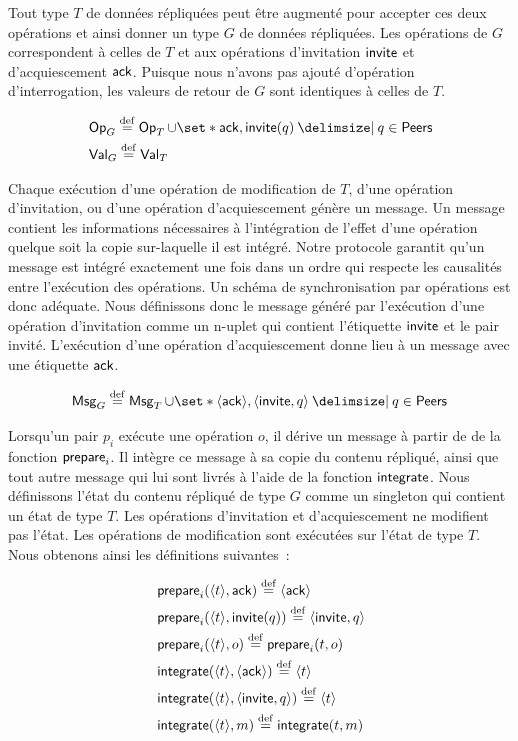 Tout type $T$ de données répliquées peut être augmenté pour accepter ces deux opérations et ainsi donner un type $G$ de données répliquées.
Les opérations de $G$ correspondent à celles de $T$ et aux opérations d'invitation $\operatorname{\mathsf{invite}}$ et d'acquiescement $\operatorname{\mathsf{ack}}$.
Puisque nous n'avons pas ajouté d'opération d'interrogation, les valeurs de retour de $G$ sont identiques à celles de $T$.

\begin{align*}
    &\trm{Op}_G \defeq \trm{Op}_T \cup \set*{\trm{ack}, \trm{invite}(q) \given q \in \trm{Peers}}\\
    &\trm{Val}_G \defeq \trm{Val}_T
\end{align*}

Chaque exécution d'une opération de modification de $T$, d'une opération d'invitation, ou d'une opération d'acquiescement génère un message.
Un message contient les informations nécessaires à l'intégration de l'effet d'une opération quelque soit la copie sur-laquelle il est intégré.
Notre protocole garantit qu'un message est intégré exactement une fois dans un ordre qui respecte les causalités entre l'exécution des opérations.
Un schéma de synchronisation par opérations est donc adéquate.
Nous définissons donc le message généré par l'exécution d'une opération d'invitation comme un n-uplet qui contient l'étiquette $\operatorname{\mathsf{invite}}$ et le pair invité.
L'exécution d'une opération d'acquiescement donne lieu à un message avec une étiquette $\operatorname{\mathsf{ack}}$.

\begin{equation*}
    \trm{Msg}_G \defeq \trm{Msg}_T \cup \set*{\tuple*{\trm{ack}}, \tuple*{\trm{invite}, q} \given q \in \trm{Peers}}
\end{equation*}

Lorsqu'un pair $p_i$ exécute une opération $o$, il dérive un message à partir de de la fonction $\operatorname{\mathsf{prepare}}_i$.
Il intègre ce message à sa copie du contenu répliqué, ainsi que tout autre message qui lui sont livrés à l'aide de la fonction $\operatorname{\mathsf{integrate}}$.
Nous définissons l'état du contenu répliqué de type $G$ comme un singleton qui contient un état de type $T$.
Les opérations d'invitation et d'acquiescement ne modifient pas l'état.
Les opérations de modification sont exécutées sur l'état de type $T$.
Nous obtenons ainsi les définitions suivantes~:

\begin{align*}
    &\trm{prepare}_i(\tuple*{t}, \trm{ack}) \defeq \tuple*{\trm{ack}}\\
    &\trm{prepare}_i(\tuple*{t}, \trm{invite}(q)) \defeq \tuple*{\trm{invite}, q}\\
    &\trm{prepare}_i(\tuple*{t}, o) \defeq \trm{prepare}_i(t, o)\\
    &\trm{integrate}(\tuple*{t}, \tuple*{\trm{ack}}) \defeq \tuple*{t}\\
    &\trm{integrate}(\tuple*{t}, \tuple*{\trm{invite}, q}) \defeq \tuple*{t}\\
    &\trm{integrate}(\tuple*{t}, m) \defeq \trm{integrate}(t, m)
\end{align*}

